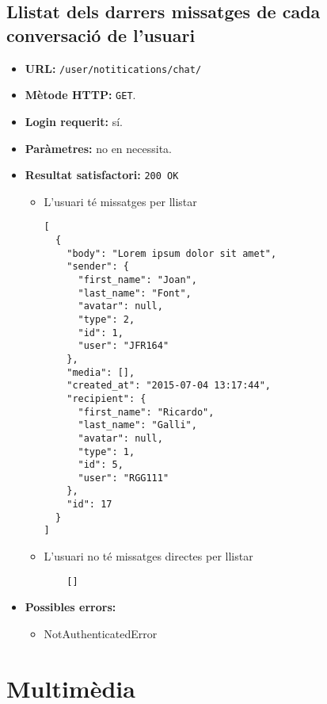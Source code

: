 \subsection{Llistat dels darrers missatges de cada conversació de l'usuari}
\begin{itemize}
\item \textbf{\ac{URL}:} \texttt{/user/notitications/chat/}
\item \textbf{Mètode \ac{HTTP}: } \texttt{GET}.
\item \textbf{Login requerit:} sí.
\item \textbf{Paràmetres:} no en necessita.

\item \textbf{Resultat satisfactori:} \texttt{200 OK}
	\begin{itemize}
		\item L'usuari té missatges per llistar
	\begin{verbatim}
[
  {
    "body": "Lorem ipsum dolor sit amet",
    "sender": {
      "first_name": "Joan",
      "last_name": "Font",
      "avatar": null,
      "type": 2,
      "id": 1,
      "user": "JFR164"
    },
    "media": [],
    "created_at": "2015-07-04 13:17:44",
    "recipient": {
      "first_name": "Ricardo",
      "last_name": "Galli",
      "avatar": null,
      "type": 1,
      "id": 5,
      "user": "RGG111"
    },
    "id": 17
  }
]
	\end{verbatim}
	
	\item L'usuari no té missatges directes per llistar
	
	\begin{verbatim}
	[]
	\end{verbatim}
	
	\end{itemize}


\item \textbf{Possibles errors:}
	\begin{itemize}
		\item NotAuthenticatedError
	\end{itemize}
\end{itemize}


\section{Multimèdia}

